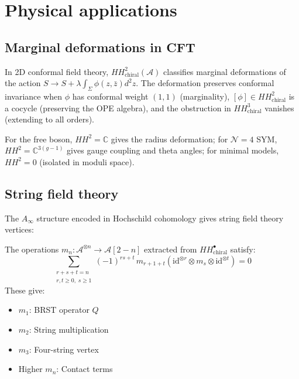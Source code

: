 \section{Physical applications}

\subsection{Marginal deformations in CFT}

In 2D conformal field theory, $HH^2_{\text{chiral}}(\mathcal{A})$ classifies marginal deformations of the action
$S \to S + \lambda \int_{\Sigma} \phi(z,\bar{z}) d^2z$.
The deformation preserves conformal invariance when $\phi$ has conformal weight $(1,1)$ (marginality), $[\phi] \in HH^2_{\text{chiral}}$ is a cocycle (preserving the OPE algebra), and the obstruction in $HH^3_{\text{chiral}}$ vanishes (extending to all orders).

\begin{example}
For the free boson, $HH^2 = \mathbb{C}$ gives the radius deformation; for $\mathcal{N}=4$ SYM, $HH^2 = \mathbb{C}^{3(g-1)}$ gives gauge coupling and theta angles; for minimal models, $HH^2 = 0$ (isolated in moduli space).
\end{example}

\subsection{String field theory}

The $A_{\infty}$ structure encoded in Hochschild cohomology gives string field theory vertices:

\begin{theorem}\label{thm:string-field-theory-hochschild}
The operations $m_n: \mathcal{A}^{\otimes n} \to \mathcal{A}[2-n]$ extracted from $HH^{\bullet}_{\text{chiral}}$ satisfy:
\[
\sum_{\substack{r+s+t=n \\ r,t \geq 0,\; s \geq 1}} (-1)^{rs+t}\, m_{r+1+t}(\mathrm{id}^{\otimes r} \otimes m_s \otimes \mathrm{id}^{\otimes t}) = 0
\]
These give:
\begin{itemize}
\item $m_1$: BRST operator $Q$
\item $m_2$: String multiplication
\item $m_3$: Four-string vertex
\item Higher $m_n$: Contact terms
\end{itemize}
\end{theorem}

